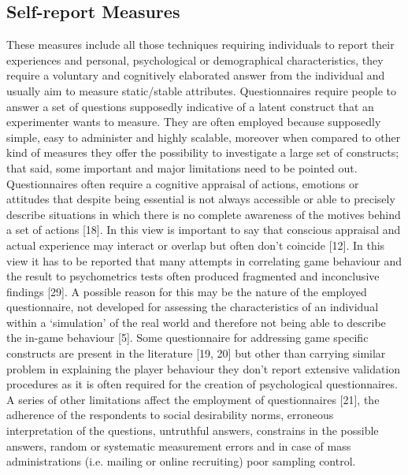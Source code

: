     \subsection{Self-report Measures}
    \label{self_report}
    These measures include all those techniques requiring individuals to report their experiences and personal, psychological or demographical characteristics, they require a voluntary and cognitively elaborated answer from the individual and usually aim to measure static/stable attributes. Questionnaires require people to answer a set of questions supposedly indicative of a latent construct that an experimenter wants to measure. They are often employed because supposedly simple, easy to administer and highly scalable, moreover when compared to other kind of measures they offer the possibility to investigate a large set of constructs; that said, some important and major limitations need to be pointed out. Questionnaires often require a cognitive appraisal of actions, emotions or attitudes that despite being essential is not always accessible or able to precisely describe situations in which there is no complete awareness of the motives behind a set of actions [18]. In this view is important to say that conscious appraisal and actual experience may interact or overlap but often don’t coincide [12]. In this view it has to be reported that many attempts in correlating game behaviour and the result to psychometrics tests often produced fragmented and inconclusive findings [29]. A possible reason for this may be the nature of the employed questionnaire, not developed for assessing the characteristics of an individual within a ‘simulation’ of the real world and therefore not being able to describe the in-game behaviour [5]. Some questionnaire for addressing game specific constructs are present in the literature [19, 20] but other than carrying similar problem in explaining the player behaviour they don’t report extensive validation procedures as it is often required for the creation of psychological questionnaires. A series of other limitations affect the employment of questionnaires [21], the adherence of the respondents to social desirability norms, erroneous interpretation of the questions, untruthful answers, constrains in the possible answers, random or systematic measurement errors and in case of mass administrations (i.e. mailing or online recruiting) poor sampling control.
